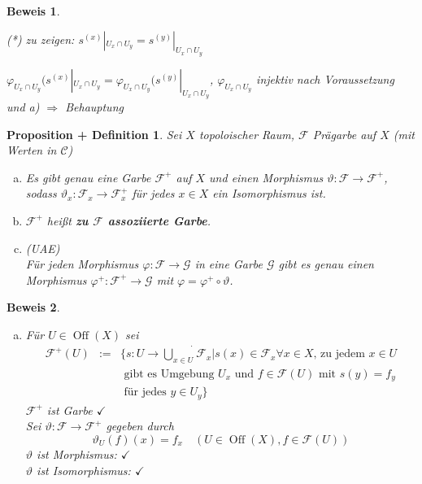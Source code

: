 \documentclass[a4paper,12pt]{report}
\theoremstyle{break}
\newtheorem{PropDef}[Def]{Proposition + Definition}
\theoremstyle{nonumberbreak}
\newtheorem{bew}{Beweis}
\theoremstyle{nonumberplain}
\newcommand{\quot}[1]{\textrm{\glqq}{#1}\textrm{\grqq}}
\newcommand{\emp}[1]{\textbf{\emph{#1}}}
\newcommand{\deftermspec}[2]{{\index{#2}}\emp{#1}}
\newenvironment{twosidedproof}{\begin{enumerate}[\quot{$\Rightarrow$}:]}{\end{enumerate}}
\DeclareMathOperator{\Off}{Off}
\newcommand{\calF}{\mathcal{F}}
\newcommand{\calG}{\mathcal{G}}
\newcommand{\calC}{\mathcal{C}}
\begin{document}
\begin{bew}
\begin{enumerate}[a)]
\begin{twosidedproof}
    (*) zu zeigen: $s^{(x)}|_{U_x\cap U_y} = s^{(y)}|_{U_x\cap U_y}$\begin{description}[\setlabelstyle{\itshape}]
    \item[denn:] $\varphi_{U_x\cap U_y}(s^{(x)}|_{U_x\cap U_y} = \varphi_{U_x\cap U_y}(s^{(y)}|_{U_x\cap U_y}$, $\varphi_{U_x\cap U_y}$ injektiv nach Voraussetzung und a) $\Rightarrow $ Behauptung
    \end{description}
  \end{twosidedproof}
\end{enumerate}\end{bew}

\begin{PropDef}
Sei $X$ topoloischer Raum, $\calF$ Pr\"agarbe auf $X$ (mit Werten in $\calC$)
\begin{enumerate}[a)]
\item
  Es gibt genau eine Garbe $\calF^+$ auf $X$ und einen Morphismus $\vartheta: \calF \to \calF^+$, sodass $\vartheta_x:\calF_x \to \calF_x^+$ f\"ur jedes $x\in X$ ein Isomorphismus ist.
\item
  $\calF^+$ hei\ss t \deftermspec{zu $\calF$ assoziierte Garbe}{Garbe!assoziierte}.
\item(UAE)\\
  F\"ur jeden Morphismus $\varphi: \calF \to \calG$ in eine Garbe $\calG$ gibt es genau einen Morphismus $\varphi^+: \calF^+ \to \calG$ mit $\varphi = \varphi^+ \circ \vartheta$.
  \begin{center}\end{center}
\end{enumerate}\end{PropDef}

\begin{bew}\begin{enumerate}[a)]\item
F\"ur $U\in \Off(X)$ sei
  \[\begin{array}{rcl}\calF^+(U) &:=& \{s: U\to \dot{\bigcup\limits_{x\in U}}\calF_x | s(x)\in \calF_x \forall x\in X \text{, zu jedem } x\in U \\ &&\text{ gibt es Umgebung } U_x \text{ und } f\in \calF(U) \text{ mit } s(y) = f_y \\&& \text{ f\"ur jedes } y \in U_y\}\end{array}\]
$\calF^+$ ist Garbe $\checkmark$\\
Sei $\vartheta: \calF \to \calF^+$ gegeben durch
  \[\boxed{\vartheta_U(f)(x) = f_x \quad (U\in \Off(X), f\in \calF(U))}\]
$\vartheta$ ist Morphismus: $\checkmark$\\
$\vartheta$ ist Isomorphismus: $\checkmark$
\end{enumerate}\end{bew}
\end{document}
